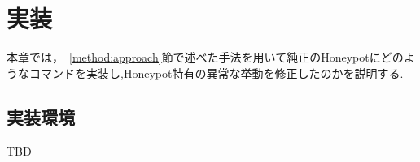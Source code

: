 \chapter{実装}
\label{implementation}

本章では，~\ref{method:approach}節で述べた手法を用いて純正のHoneypotにどのようなコマンドを実装し,Honeypot特有の異常な挙動を修正したのかを説明する.

\section{実装環境}
\label{implementation:env}
TBD




